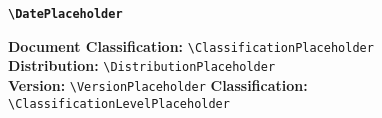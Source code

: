 \documentclass[a4paper,11pt]{article}
\begin{document}
\begin{center}
\color{accent}
\fontsize{16}{20}\selectfont\bfseries\sffamily
\texttt{\textbackslash DatePlaceholder}
\end{center}

\vfill

\begin{center}
\end{center}

\vspace{0.3in}

\begin{classificationbox}
\centering
\footnotesize\sffamily
\textbf{Document Classification:} \texttt{\textbackslash ClassificationPlaceholder}\\
\textbf{Distribution:} \texttt{\textbackslash DistributionPlaceholder}\\
\textbf{Version:} \texttt{\textbackslash VersionPlaceholder} \quad 
\textbf{Classification:} \texttt{\textbackslash ClassificationLevelPlaceholder}
\end{classificationbox}
\end{document}
